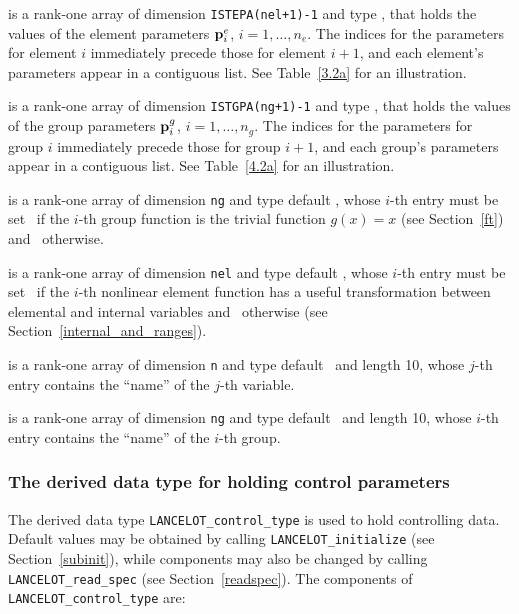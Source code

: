 \documentclass{galahad}
\newcommand{\fullpackagename}{LANC\-E\-LOT}
\begin{document}
\begin{description}
 is a rank-one array of dimension {\tt ISTEPA(nel+1)-1}
and type \realdp, that holds
the values of the element parameters ${\mathbf{p}}^e_i$, $i = 1, \ldots,
n_e$. The indices for the parameters for element $i$ immediately precede
those for element $i+1$, and each element's parameters appear in a contiguous
list. See Table~\ref{3.2a} for an illustration.

 is a rank-one array of dimension {\tt ISTGPA(ng+1)-1}
and type \realdp, that holds
the values of the group parameters ${\mathbf{p}}^g_i$, $i = 1, \ldots,
n_g$. The indices for the parameters for group $i$ immediately precede
those for group $i+1$, and each group's parameters appear in a contiguous
list. See Table~\ref{4.2a} for an illustration.

 is a rank-one array of dimension {\tt ng} and type
default \logical, whose $i$-th entry must be
set \true\ if the $i$-th group function is the trivial function
$g(x)=x$ (see Section~\ref{ft}) and \false\ otherwise.

 is a rank-one array of dimension {\tt nel} and type
default \logical, whose $i$-th entry must be
set \true\ if the $i$-th nonlinear element function has a useful
transformation between elemental and internal variables
and \false\ otherwise (see Section~\ref{internal_and_ranges}).

 is a rank-one array of dimension {\tt n} and type
default \character\ and length 10, whose $j$-th entry contains the
``name'' of the $j$-th variable.

 is a rank-one array of dimension {\tt ng} and type
default \character\ and length 10, whose $i$-th entry contains the
``name'' of the $i$-th group.

\end{description}


\subsubsection{The derived data type for holding control
 parameters}\label{typecontrol}
The derived data type
{\tt \fullpackagename\_control\_type}
is used to hold controlling data. Default values may be obtained by calling
{\tt \fullpackagename\_initialize}
(see Section~\ref{subinit}),
while components may also be changed by calling
{\tt \fullpackagename\_read\-\_spec}
(see Section~\ref{readspec}).
The components of
{\tt \fullpackagename\_control\_type}
are:
\end{document}
